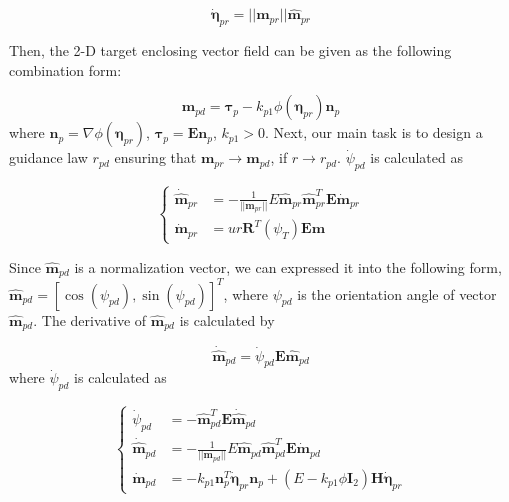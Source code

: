 \documentclass[a4paper, 10pt, conference]{ieeeconf}      %
\begin{document}
\begin{equation}\label{eq13}
	\dot{\bm{\eta}}_{pr}=||\bm{m}_{pr}||\hat{\bm{m}}_{pr}
\end{equation}

Then, the 2-D target enclosing vector field can be given as the following combination form:

\begin{equation}\label{eq14}
	\bm{m}_{pd}=\bm{\tau}_{p}-k_{p1}\phi(\bm{\eta}_{pr}) \bm{n}_p
\end{equation}
where $\bm{n}_p=\nabla \phi(\bm{\eta}_{pr})$, $\bm{\tau}_p=\bm{E}\bm{n}_p$, $k_{p1}>0$. Next, our main task is to design a guidance law $r_{pd}$ ensuring that $\bm{m}_{pr}\rightarrow \bm{m}_{pd}$, if $r\rightarrow r_{pd}$. $\dot{\psi}_{pd}$ is calculated as

\begin{equation}\label{eq15}
	\left\{
	\begin{aligned}
		\dot{\hat{\bm{m}}}_{pr}&=-\frac{1}{||\bm{m}_{pr}||}E\hat{\bm{m}}_{pr}\hat{\bm{m}}^T_{pr}\bm{E}\dot{\bm{m}}_{pr}\\
		\dot{\bm{m}}_{pr}&=ur\bm{R}^T(\psi_T)\bm{E}\bm{m}
	\end{aligned}
	\right.
\end{equation}

Since $\hat{\bm{m}}_{pd}$ is a normalization vector, we can expressed it into the following form, $\hat{\bm{m}}_{pd}=[\cos(\psi_{pd}),\sin(\psi_{pd})]^T$, where $\psi_{pd}$ is the orientation angle of vector $\hat{\bm{m}}_{pd}$. The derivative of $\hat{\bm{m}}_{pd}$ is calculated by

\begin{equation}\label{eq16}
	\dot{\hat{\bm{m}}}_{pd}=\dot{\psi}_{pd}\bm{E}\hat{\bm{m}}_{pd}
\end{equation}
where $\dot{\psi}_{pd}$ is calculated as

\begin{equation}\label{eq17}
	\left\{
	\begin{aligned}
		\dot{\psi}_{pd}&=-\hat{\bm{m}}^T_{pd}\bm{E}\dot{\hat{\bm{m}}}_{pd}\\
		\dot{\hat{\bm{m}}}_{pd}&=-\frac{1}{||\bm{m}_{pd}||}E\hat{\bm{m}}_{pd}\hat{\bm{m}}^T_{pd}\bm{E}\dot{\bm{m}}_{pd}\\
		\dot{\bm{m}}_{pd}&=-k_{p1}\bm{n}^T_p\dot{\bm{\eta}}_{pr}\bm{n}_p+(E-k_{p1}\phi \bm{I}_2)\bm{H}\dot{\bm{\eta}}_{pr}
	\end{aligned}
	\right.
\end{equation}
\end{document}
